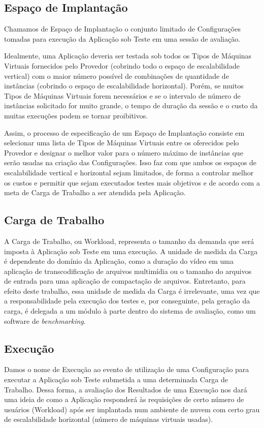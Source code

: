 \subsection{Espaço de Implantação}
Chamamos de Espaço de Implantação o conjunto limitado de Configurações tomadas 
para execução da Aplicação sob Teste em uma sessão de avaliação.
 
Idealmente, uma Aplicação deveria ser testada sob todos os Tipos de Máquinas 
Virtuais fornecidos pelo Provedor (cobrindo todo o espaço de escalabilidade 
vertical) com o maior número possível de combinações de quantidade de instâncias 
(cobrindo o espaço de escalabilidade horizontal). Porém, se muitos Tipos de 
Máquinas Virtuais forem necessários e se o intervalo de número de instâncias 
solicitado for muito grande, o tempo de duração da sessão e o custo da muitas 
execuções podem se tornar proibitivos.

Assim, o processo de especificação de um Espaço de Implantação consiste em 
selecionar uma lista de Tipos de Máquinas Virtuais entre os oferecidos pelo 
Provedor e designar o melhor valor para o número máximo de instâncias que serão 
usadas na criação das Configurações. Isso faz com que ambos os espaços de 
escalabilidade vertical e horizontal sejam limitados, de forma a controlar 
melhor os custos e permitir que sejam executados testes mais objetivos e de 
acordo com a meta de Carga de Trabalho a ser atendida pela Aplicação.

\subsection{Carga de Trabalho}
A Carga de Trabalho, ou Workload, representa o tamanho da demanda que será 
imposta à Aplicação sob Teste em uma execução. A unidade de medida da Carga é 
dependente do domínio da Aplicação, como a duração do vídeo em uma aplicação
de transcodificação de arquivos multimídia ou o tamanho do arquivos de entrada
para uma aplicação de compactação de arquivos. Entretanto, para efeito deste 
trabalho, essa unidade de medida da Carga é irrelevante, uma vez que a 
responsabilidade pela execução dos testes e, por conseguinte, pela geração da 
carga, é delegada a um módulo à parte dentro do sistema de avaliação, como um
software de \emph{benchmarking}.

\subsection{Execução}
Damos o nome de Execução ao evento de utilização de uma Configuração para 
executar a Aplicação sob Teste submetida a uma determinada Carga de Trabalho. 
Dessa forma, a avaliação dos Resultados de uma Execução nos dará uma ideia de 
como a Aplicação responderá às requisições de certo número de usuários (Workload) 
após ser implantada num ambiente de nuvem com certo grau de escalabilidade 
horizontal (número de máquinas virtuais usadas). 

